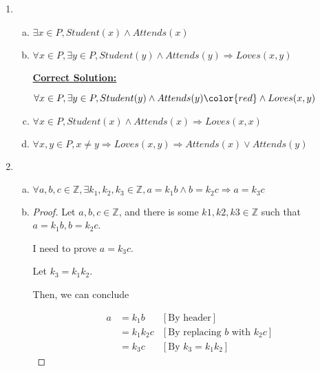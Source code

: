 \documentclass[12pt]{article}
\begin{document}
\begin{enumerate}[1.]
\begin{enumerate}[a)]
    \end{enumerate}

    \item

    \begin{enumerate}[a)]
        \item $\exists x \in P, Student(x) \land Attends(x)$
        \item $\forall x \in P, \exists y \in P, Student(y) \land Attends(y) \Rightarrow Loves(x,y)$

        \bigskip

        \begin{mdframed}
            \underline{\textbf{Correct Solution:}}

            \bigskip

            $\forall x \in P, \exists y \in P, Student(y) \land Attends(y) \color{red} \land Loves(x,y)$
        \end{mdframed}

        \item $\forall x \in P, Student(x) \land Attends(x) \Rightarrow Loves(x,x)$
        \item $\forall x,y \in P, x \neq y \Rightarrow Loves(x,y) \Rightarrow Attends(x) \lor Attends(y)$
    \end{enumerate}

    \item

    \begin{enumerate}[a)]
        \item $\forall a,b,c \in \mathbb{Z}, \exists k_1, k_2, k_3 \in \mathbb{Z}, a = k_1b \land b = k_2c \Rightarrow a = k_3c$
        \item

        \begin{proof}
        Let $a,b,c \in \mathbb{Z}$, and there is some $k1,k2,k3 \in \mathbb{Z}$ such that
        $a = k_1b, b = k_2c$.

        \bigskip

        I need to prove $a = k_3 c$.

        \bigskip

        Let $k_3 = k_1k_2$.

        \bigskip

        Then, we can conclude

        \begin{align}
            a &= k_1b    & [\text{By header}]\\
            &= k_1k_2c    & [\text{By replacing $b$ with $k_2c$}]\\
            &= k_3c    & [\text{By $k_3 = k_1k_2$}]
        \end{align}
        \end{proof}
    \end{enumerate}
\end{enumerate}
\end{document}
